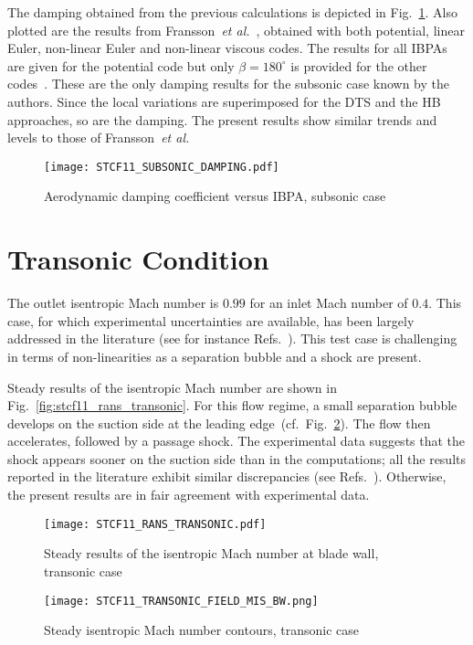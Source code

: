 The damping obtained from the previous calculations is depicted 
in Fig.~\ref{fig:stcf11_subsonic_damping}.  Also plotted are the results
from Fransson~\emph{et al.}~\cite{Fransson:1999uq}, obtained with both
potential, linear Euler, non-linear Euler and non-linear viscous codes.
The results for all IBPAs are given for the potential code but only $\beta=180^\circ$ is provided for the other codes~\cite{Fransson:1999uq}.
These are the only damping results for the
subsonic case known by the authors.  Since the local variations are
superimposed for the DTS and the HB approaches, so are the damping.
The present
results show similar trends and levels to those of Fransson~\emph{et al.} 
\begin{figure}[htb]
  \centering
  \texttt{[image: STCF11\_SUBSONIC\_DAMPING.pdf]}
  \caption{Aerodynamic damping coefficient versus IBPA, subsonic case}
  \label{fig:stcf11_subsonic_damping}
\end{figure}



\section{Transonic Condition}
The outlet isentropic Mach number is $0.99$ for an inlet Mach number of $0.4$. 
This case, for which experimental uncertainties are available, 
has been largely addressed in the literature 
(see for instance Refs.~\cite{Sbardella:2001fk,Duta:2002uq,Campobasso:2003fk,Cinnella2004}). 
This test case is challenging in terms of non-linearities as a separation bubble and a shock are present.

Steady results of the isentropic Mach number are shown in
Fig.~\ref{fig:stcf11_rans_transonic}.  For this flow regime,
a small separation
bubble develops on the suction side at the leading edge~(cf.~Fig.~\ref{fig:stcf11_transonic_field_mis_bw}).  The flow then accelerates, followed by a passage shock.  
The experimental data suggests that the shock appears
sooner on the suction side than in the computations; all the results 
reported in the literature exhibit similar discrepancies (see
Refs.~\cite{Fransson:1999uq,Sbardella:2001fk,Duta:2002uq,Campobasso:2003fk,Cinnella2004}). 
Otherwise, the present results are in fair agreement with experimental data.
\begin{figure}[htb]
  \centering
  \begin{minipage}[b]{.46\linewidth}
    \centering
    \texttt{[image: STCF11\_RANS\_TRANSONIC.pdf]}
    \caption{Steady results of the isentropic Mach number at blade
      wall, transonic case}
    \label{fig:stcf11_rans_transonic}
  \end{minipage}\quad
  \begin{minipage}[b]{.46\linewidth}
    \centering
    \texttt{[image: STCF11\_TRANSONIC\_FIELD\_MIS\_BW.png]}
    \caption{Steady isentropic Mach number contours, transonic case}
    \label{fig:stcf11_transonic_field_mis_bw}
  \end{minipage}
\end{figure}

